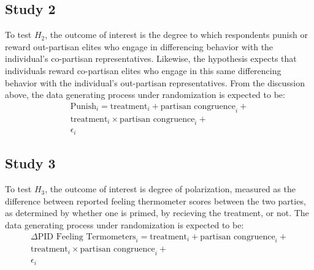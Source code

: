 \documentclass[12pt]{article}
\begin{document}
\subsection{Study 2}
To test $H_2$, the outcome of interest is the degree to which respondents punish or reward out-partisan elites who engage in differencing behavior with the individual's co-partisan representatives. Likewise, the hypothesis expects that individuals reward co-partisan elites who engage in this same differencing behavior with the individual's out-partisan representatives. From the discussion above, the data generating process under randomization is expected to be:
\begin{equation}
\begin{aligned}
\text{Punish}_i = \text{treatment}_i + \text{partisan congruence}_i + \\
     \text{treatment}_i \times \text{partisan congruence}_i + \\ 
     \epsilon_i
\end{aligned}
\end{equation}


\subsection{Study 3}
To test $H_3$, the outcome of interest is degree of polarization, measured as the difference between reported feeling thermometer scores between the two parties, as determined by whether one is primed, by recieving the treatment, or not. The data generating process under randomization is expected to be:
\begin{equation}
\begin{aligned}
\Delta \text{PID Feeling Termometers}_i = \text{treatment}_i + \text{partisan congruence}_i + \\
     \text{treatment}_i \times \text{partisan congruence}_i + \\ 
     \epsilon_i
\end{aligned}
\end{equation}
\end{document}
